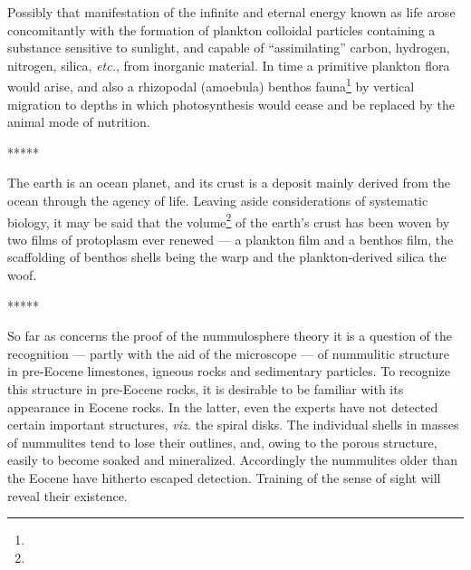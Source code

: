 \documentclass[a4paper, 12pt, oneside]{article}
\begin{document}
Possibly that manifestation of the infinite and eternal energy known as life arose concomitantly with the formation of plankton colloidal particles containing a substance sensitive to sunlight, and capable of ``assimilating'' carbon, hydrogen, nitrogen, silica, \emph{etc.}, from inorganic material. In time a primitive plankton flora would arise, and also a rhizopodal (amoebula) benthos fauna\footnote{} by vertical migration to depths in which photosynthesis would cease and be replaced by the animal mode of nutrition.

\centerline{*\hspace{15mm}*\hspace{15mm}*\hspace{15mm}*\hspace{15mm}*}
\bigskip

The earth is an ocean planet, and its crust is a deposit mainly derived from the ocean through the agency of life. Leaving aside considerations of systematic biology, it may be said that the volume\footnote{} of the earth's crust has been woven by two films of protoplasm ever renewed --- a plankton film and a benthos film, the scaffolding of benthos shells being the warp and the plankton-derived silica the woof.

\centerline{*\hspace{15mm}*\hspace{15mm}*\hspace{15mm}*\hspace{15mm}*}
\bigskip

So far as concerns the proof of the nummulosphere theory it is a question of the recognition --- partly with the aid of the microscope --- of nummulitic structure in pre-Eocene limestones, igneous rocks and sedimentary particles. To recognize this structure in pre-Eocene rocks, it is desirable to be familiar with its appearance in Eocene rocks. In the latter, even the experts have not detected certain important structures, \emph{viz.} the spiral disks. The individual shells in masses of nummulites tend to lose their outlines, and, owing to the porous structure, easily to become soaked and mineralized. Accordingly the nummulites older than the Eocene have hitherto escaped detection. Training of the sense of sight will reveal their existence.
\end{document}
